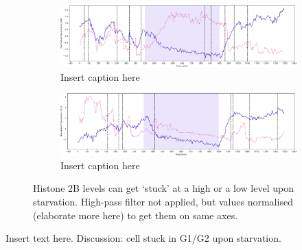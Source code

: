 \begin{figure}
  \centering
  \begin{subfigure}[htpb]{0.9\textwidth}
   \centering
   \includegraphics[width=\textwidth]{starvation_raw_13-07-02.pdf}
   \caption{
     Insert caption here
   }
   \label{fig:biology-starvation-raw-1}
  \end{subfigure}

  \begin{subfigure}[htpb]{0.9\textwidth}
   \centering
   \includegraphics[width=\textwidth]{starvation_raw_13-39-01.pdf}
   \caption{
     Insert caption here
   }
   \label{fig:biology-starvation-raw-2}
  \end{subfigure}

  \caption{
    Histone 2B levels can get `stuck' at a high or a low level upon starvation.
    High-pass filter not applied, but values normalised (elaborate more here) to get them on same axes.
  }
  \label{fig:biology-starvation-raw}
\end{figure}

Insert text here.  Discussion: cell stuck in G1/G2 upon starvation.



